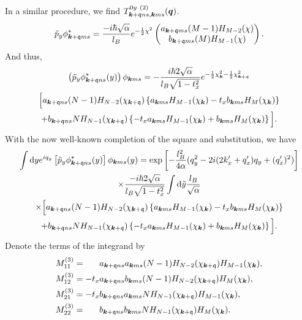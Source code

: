 In a similar procedure, we find \( T^{0y~(2)}_{\bm{k}+\mathfrak{q} ns, \bm{k} ms}(\bm{q}) \).
\begin{equation}
  \tilde{p}_y \phi^{*}_{\bm{k}+\mathfrak{q} m s} = \frac{-i \hbar \sqrt{\alpha } }{l_{B}}  e^{-\frac{1}{2} \chi ^2}
                                   \begin{pmatrix}
                                     a_{\bm{k}+\mathfrak{q} m s} (M-1) H_{M-2} (\chi) \\
                                     b_{\bm{k}+\mathfrak{q} m s} (M) H_{M-1} (\chi)
                                   \end{pmatrix}.
\end{equation}
And thus,
\begin{multline}
  \left( \tilde{p}_y \phi ^{*} _{\bm{k} + \mathfrak{q} ns} (y) \right) \phi _{\bm{k} m s}
  = -\frac{i\hbar 2 \sqrt{\alpha } }{l_{B} \sqrt{1 - t_{x}^2} }
  e^{-\frac{1}{2} \chi _{\bm{k}}^2 - \frac{1}{2} \chi _{\bm{k} + \mathfrak{q}} ^2}\\
  \Big[
  a_{\bm{k} + \mathfrak{q} ns} (N-1) H_{N-2}(\chi_{\bm{k}+\mathfrak{q}})
  \left\{a_{\bm{k} ms} H_{M-1} (\chi_{\bm{k}}) - t_{x} b_{\bm{k} ms} H_{M} (\chi_{\bm{k}})\right\}\\
  +
  b_{\bm{k} + \mathfrak{q} ns} N H_{N-1} (\chi_{\bm{k} + \mathfrak{q}})
  \left\{-t_{x} a_{\bm{k} ms}  H_{M-1} (\chi_{\bm{k}}) + b_{\bm{k} ms} H_{M} (\chi_{\bm{k}})\right\}
  \Big].
\end{multline}
With the now well-known completion of the square and substitution, we have
\begin{multline}
  \int \mathrm{d}y
  e^{i q_{y}}
  \left[\tilde{p}_y \phi ^{*}_{\bm{k} + \mathfrak{q} ns}(y) \right]
  \phi_{\bm{k} ms} (y)
  =
  \exp
  \left[
    - \frac{l_{B}^2}{4 \alpha } (q_{y}^2 - 2 i (2k' _x + q' _x) q_{y} + (q' _x)^2 )
  \right  ]\\
  \times \frac{ - i\hbar 2 \sqrt{\alpha} }{l_{B} \sqrt{1 - t_{x}^2} }
  \int \mathrm{d} \tilde{y} \frac{l_{B}}{\sqrt{\alpha } }\\
  \times \Big[
  a_{\bm{k} + \mathfrak{q} ns} (N-1) H_{N-2}(\chi_{\bm{k}+\mathfrak{q}})
  \left\{a_{\bm{k} ms} H_{M-1} (\chi_{\bm{k}}) - t_{x} b_{\bm{k} ms} H_{M} (\chi_{\bm{k}})\right\}\\
  +
  b_{\bm{k} + \mathfrak{q} ns} N H_{N-1} (\chi_{\bm{k} + \mathfrak{q}})
  \left\{-t_{x} a_{\bm{k} ms}  H_{M-1} (\chi_{\bm{k}}) + b_{\bm{k} ms} H_{M} (\chi_{\bm{k}})\right\}
  \Big].
\end{multline}
Denote the terms of the integrand by
\begin{align}
  M^{(3)}_{11} &= \phantom{-t_x} a_{\bm{k} + \mathfrak{q} ns} a_{\bm{k} ms} (N-1) H_{N-2} (\chi_{\bm{k} + \mathfrak{q}}) H_{M-1} (\chi_{\bm{k}}),\\
  M^{(3)}_{12} &= -t_x a_{\bm{k} + \mathfrak{q} ns} b_{\bm{k} ms} (N-1) H_{N-2} (\chi_{\bm{k} + \mathfrak{q}}) H_{M} (\chi_{\bm{k}}),\\
  M^{(3)}_{21} &= -t_x b_{\bm{k} + \mathfrak{q} ns} a_{\bm{k} ms} N H_{N-1} (\chi_{\bm{k} + \mathfrak{q}}) H_{M-1} (\chi_{\bm{k}}),\\
  M^{(3)}_{22} &= \phantom{-t_x} b_{\bm{k} + \mathfrak{q} ns} b_{\bm{k} ms} N H_{N-1} (\chi_{\bm{k} + \mathfrak{q}}) H_{M} (\chi_{\bm{k}}).
\end{align}
